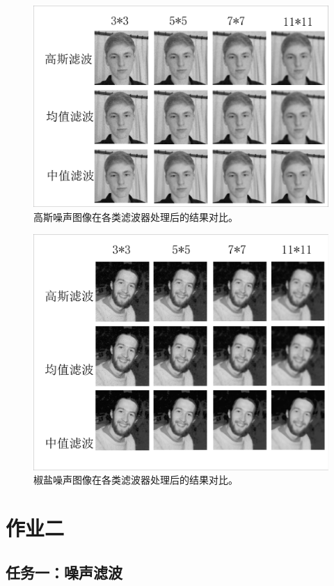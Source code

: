 \documentclass[10pt,twocolumn,letterpaper]{article}
\begin{document}
\begin{figure}[th]
   \centering
   \includegraphics[width=0.95\linewidth]{GaussNoise2.pdf}
   \caption{高斯噪声图像在各类滤波器处理后的结果对比。}   
   \label{fig:GaussNoise1}
\end{figure}

\begin{figure}[th]
   \centering
   \includegraphics[width=0.95\linewidth]{SAPNoise1.pdf}
   \caption{椒盐噪声图像在各类滤波器处理后的结果对比。}   
   \label{fig:SAPNoise1}
\end{figure}


\section{作业二}

\subsection{任务一：噪声滤波}
\end{document}
